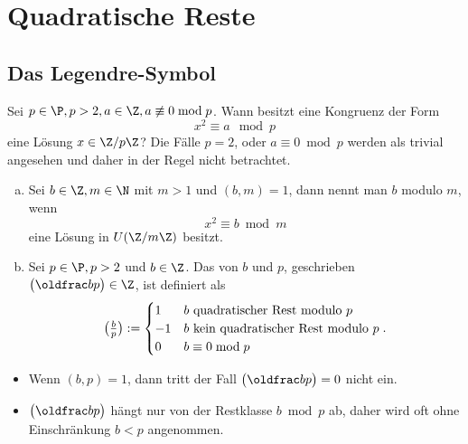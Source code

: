 \section{Quadratische Reste}


\subsection{Das Legendre-Symbol}

Sei $p \in \P, p > 2, a \in \Z, a \not\equiv 0 \bmod p$.
Wann besitzt eine Kongruenz der Form
\[
	x^2 \equiv a \mod p
\]
eine Lösung $x \in \Z / p \Z$?
Die Fälle $p = 2$, oder $a \equiv 0 \bmod p$ werden als trivial angesehen und daher in der Regel nicht betrachtet.

\begin{df} \label{2.13}
	\begin{enumerate}[a)]
		\item
		Sei $b \in \Z, m \in \N$ mit $m > 1$ und $(b, m) = 1$, dann nennt man $b$  modulo $m$, wenn
		\[
			x^2 \equiv b \bmod m
		\]
		eine Lösung in $U(\Z / m\Z)$ besitzt.
		\item
			Sei $p \in \P, p > 2$ und $b \in \Z$.
			Das  von $b$ und $p$, geschrieben $\legsym bp \in \Z$, ist definiert als
			\[
				\legsym bp := \begin{cases}
					1 & \text{$b$ quadratischer Rest modulo $p$} \\
					-1 & \text{$b$ kein quadratischer Rest modulo $p$} \\
					0 & \text{$b \equiv 0 \bmod p$}
				\end{cases}.
			\]
	\end{enumerate}
	\begin{note}
		\begin{itemize}
			\item
				Wenn $(b, p) = 1$, dann tritt der Fall $\legsym bp = 0$ nicht ein.
			\item
				$\legsym bp$ hängt nur von der Restklasse $b \bmod p$ ab, daher wird oft ohne Einschränkung $b < p$ angenommen.
		\end{itemize}
	\end{note}
\end{df}


